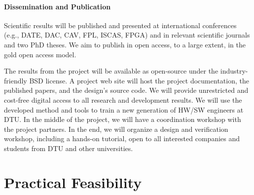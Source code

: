 \documentclass[fleqn,12pt]{article}
\newcommand{\todo}[1]{{\it TODO: #1}}
\begin{document}
\paragraph*{Dissemination and Publication}

Scientific results will be published and presented at international
conferences (e.g., DATE, DAC, CAV, FPL, ISCAS, FPGA) and in relevant scientific journals
and two PhD theses.
We aim to publish in open access, to a large extent, in the gold open access model.

The results from the project will be available as open-source under the
industry-friendly BSD license.
A project web site will host the project documentation, the published papers, and the design's source code.
We will provide unrestricted and cost-free digital access to all research and development results.
%
We will use the developed method and tools to train a new generation of HW/SW engineers
at DTU.
In the middle of the project, we will have a coordination workshop with the project partners.
In the end, we will organize a design and verification workshop, including a hands-on tutorial,
open to all interested companies and students from DTU and other universities.

\section{Practical Feasibility}


%
\end{document}
